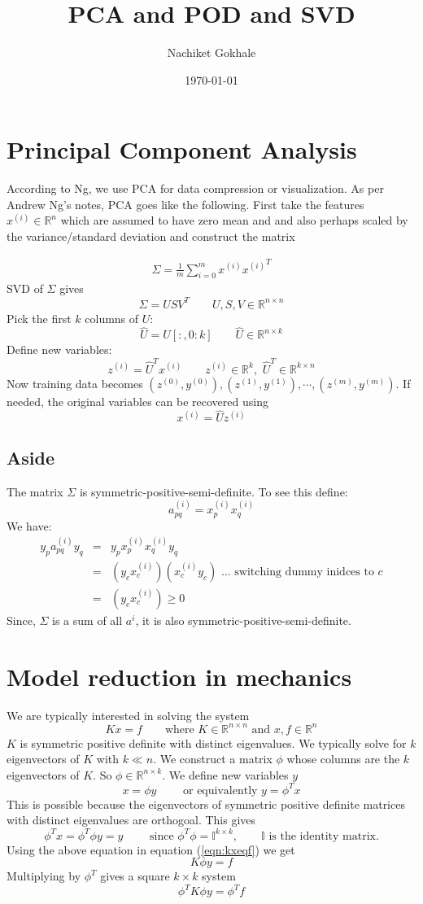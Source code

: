 \documentclass{article}
\newcommand{\beq}{\begin{equation}}
\newcommand{\eeq}{\end{equation}}
\newcommand{\ber}{\begin{eqnarray}}
\newcommand{\eer}{\end{eqnarray}}
\begin{document}
\title{PCA and POD and SVD}
\author{Nachiket Gokhale}
\date{\today}
\maketitle
\section{Principal Component Analysis}
According to Ng, we use PCA for data compression or visualization. As per Andrew Ng's notes, PCA goes like the following. First take the features $x^{(i)} \in \mathbb{R}^n$ which are assumed to have zero mean and and also perhaps scaled by the variance/standard deviation and construct the matrix

\ber
\label{eqn:discretexxt}
\Sigma = \frac{1}{m}\sum_{i=0}^{m}x^{(i)}{x^{(i)}}^{T}
\eer
%
SVD of $\Sigma$ gives
\beq
\Sigma = USV^{T} \qquad U,S,V \in \mathbb{R}^{n\times{n}}
\eeq
Pick the first $k$ columns of $U$:
\beq
\hat{U} = U[:,0:k]  \qquad \hat{U} \in \mathbb{R}^{n\times{k}}
\eeq
Define new variables:
\beq
z^{(i)}   = {\hat{U}}^{T}x^{(i)} \qquad z^{(i)} \in \mathbb{R}^{k},\,\, {\hat{U}}^{T} \in \mathbb{R}^{k\times{n}}
\eeq
Now training data becomes $(z^{(0)},y^{(0)}), (z^{(1)},y^{(1)}), \cdots, (z^{(m)},y^{(m)})$. If needed, the original variables can be recovered using
\beq
x^{(i)} = \hat{U}z^{(i)}
\eeq

%
%
\subsection{Aside} 
The matrix $\Sigma$ is symmetric-positive-semi-definite. To see this define:
\beq
a_{pq}^{(i)} = x^{(i)}_{p}{x^{(i)}_{q}}
\eeq
We have:
\ber
y_{p}a_{pq}^{(i)}y_{q} &=& y_{p}x^{(i)}_{p}{x^{(i)}_{q}}y_{q}  \\
&=& (y_{c}x^{(i)}_{c})({x^{(i)}_{c}}y_{c}) \text{ ... switching dummy inidces to }c\\
&=& (y_{c}x^{(i)}_{c}) \ge 0
\eer
Since, $\Sigma$ is a sum of all $a^{i}$, it is also symmetric-positive-semi-definite.
\section{Model reduction in mechanics}
We are typically interested in solving the system
\beq
\label{eqn:kxeqf}
Kx = f \qquad \text{where } K\in\mathbb{R}^{n\times{n}} \text{ and } x,f \in \mathbb{R}^n
\eeq
$K$ is symmetric positive definite with distinct eigenvalues. We typically solve for $k$ eigenvectors of $K$ with $k \ll n$. We construct a matrix $\phi$ whose columns are the $k$ eigenvectors of $K$. So $\phi \in \mathbb{R}^{n\times{k}}$. We define new variables $y$
\beq
x = \phi{y} \qquad \text{ or equivalently } y = \phi^Tx
\eeq
This is possible because the eigenvectors of symmetric positive definite matrices with distinct eigenvalues are orthogoal. This gives
\beq
\phi^Tx = \phi^T\phi y = y \qquad \text{ since } \phi^T\phi = \mathbb{I}^{k\times{k}}, \qquad \mathbb{I} \text{ is the identity matrix.}
\eeq
Using the above equation in equation (\ref{eqn:kxeqf}) we get
\beq
K\phi{y} = f
\eeq
Multiplying by $\phi^T$ gives a square $k\times{k}$ system
\beq
\phi^TK\phi{y} = \phi^Tf
\eeq
\end{document}
